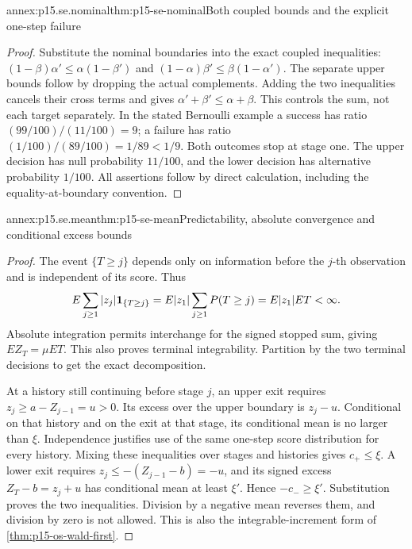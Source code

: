 \begin{annexitem}{annex:p15.se.nominal}{thm:p15-se-nominal}{Both coupled bounds and the explicit one-step failure}
\begin{proof}
Substitute the nominal boundaries into the exact coupled inequalities:
\((1-\beta)\alpha'\leq\alpha(1-\beta')\) and
\((1-\alpha)\beta'\leq\beta(1-\alpha')\).
The separate upper bounds follow by dropping the actual complements.
Adding the two inequalities cancels their cross terms and gives
\(\alpha'+\beta'\leq\alpha+\beta\). This controls the sum, not each
target separately. In the stated Bernoulli example a success has ratio
\((99/100)/(11/100)=9\); a failure has ratio
\((1/100)/(89/100)=1/89<1/9\). Both outcomes stop at stage one.
The upper decision has null probability \(11/100\), and the lower
decision has alternative probability \(1/100\). All assertions follow
by direct calculation, including the equality-at-boundary convention.
\end{proof}
\end{annexitem}

\begin{annexitem}{annex:p15.se.mean}{thm:p15-se-mean}{Predictability, absolute convergence and conditional excess bounds}
\begin{proof}
The event \(\{T\geq j\}\) depends only on information before the
\(j\)-th observation and is independent of its score. Thus
\[
 E\sum_{j\geq1}|z_j|{\bf1}_{\{T\geq j\}}
     =E|z_1|\sum_{j\geq1}P(T\geq j)=E|z_1|ET<\infty.
\]
Absolute integration permits interchange for the signed stopped sum,
giving \(EZ_T=\mu ET\). This also proves terminal integrability.
Partition by the two terminal decisions to get the exact decomposition.

At a history still continuing before stage \(j\), an upper exit
requires \(z_j\geq a-Z_{j-1}=u>0\). Its excess over the upper boundary
is \(z_j-u\). Conditional on that history and on the exit at that
stage, its conditional mean is no larger than \(\xi\). Independence
justifies use of the same one-step score distribution for every history.
Mixing these inequalities over stages and histories gives
\(c_+\leq\xi\). A lower exit requires
\(z_j\leq-(Z_{j-1}-b)=-u\), and its signed excess
\(Z_T-b=z_j+u\) has conditional mean at least \(\xi'\).
Hence \(-c_-\geq\xi'\). Substitution proves the two inequalities.
Division by a negative mean reverses them, and division by zero is not
allowed. This is also the integrable-increment form of
\cref{thm:p15-os-wald-first}.
\end{proof}
\end{annexitem}

